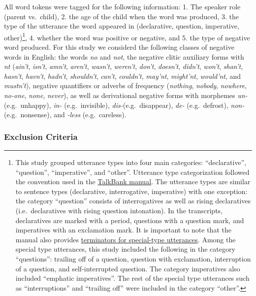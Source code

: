 \documentclass[man,floatsintext,draftall]{apa6}
\let\rmarkdownfootnote\footnote%
\def\footnote{\protect\rmarkdownfootnote}
\begin{document}
All word tokens were tagged for the following information: 1. The
speaker role (parent vs.~child), 2. the age of the child when the word
was produced, 3. the type of the utterance the word appeared in
(declarative, question, imperative, other)\footnote{This study grouped
  utterance types into four main categories: \enquote{declarative},
  \enquote{question}, \enquote{imperative}, and \enquote{other}.
  Utterance type categorization followed the convention used in the
  \href{https://talkbank.org/manuals/CHAT.html\#_Toc486414422}{TalkBank
  manual}. The utterance types are similar to sentence types
  (declarative, interrogative, imperative) with one exception: the
  category \enquote{question} consists of interrogatives as well as
  rising declaratives (i.e.~declaratives with rising question
  intonation). In the transcripts, declaratives are marked with a
  period, questions with a question mark, and imperatives with an
  exclamation mark. It is important to note that the manual also
  provides
  \href{https://talkbank.org/manuals/CHAT.html\#_Toc486414431}{terminators
  for special-type utterances}. Among the special type utterances, this
  study included the following in the category \enquote{questions}:
  trailing off of a question, question with exclamation, interruption of
  a question, and self-interrupted question. The category imperatives
  also included \enquote{emphatic imperatives}. The rest of the special
  type utterances such as \enquote{interruptions} and \enquote{trailing
  off} were included in the category \enquote{other}.}, 4. whether the
word was positive or negative, and 5. the type of negative word
produced. For this study we considerd the following classes of negative
words in English: the words \emph{no} and \emph{not}, the negative
clitic auxiliary forms with \emph{nt} (\emph{ain't}, \emph{isn't},
\emph{amn't}, \emph{aren't}, \emph{wasn't}, \emph{weren't},
\emph{don't}, \emph{doesn't}, \emph{didn't}, \emph{won't},
\emph{shan't}, \emph{hasn't}, \emph{havn't}, \emph{hadn't},
\emph{shouldn't}, \emph{can't}, \emph{couldn't}, \emph{may'nt},
\emph{might'nt}, \emph{would'nt}, and \emph{mustn't}), negative
quantifiers or adverbs of frequency (\emph{nothing}, \emph{nobody},
\emph{nowhere}, \emph{no-one}, \emph{none}, \emph{never}), as well as
derivational negative forms with morphemes \emph{un-} (e.g.~unhappy),
\emph{in-} (e.g.~invisible), \emph{dis-}(e.g.~disappear), \emph{de-}
(e.g.~defrost), \emph{non-} (e.g.~nonsense), and \emph{-less}
(e.g.~careless).

\subsubsection{Exclusion Criteria}\label{exclusion-criteria}
\end{document}
